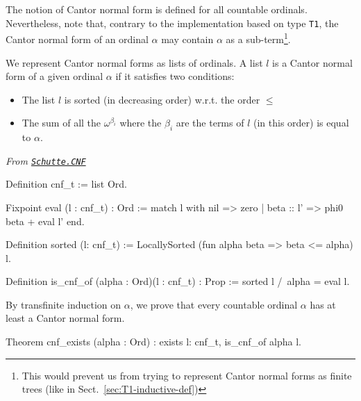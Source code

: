 {The notion of Cantor normal form is defined for all countable ordinals.
Nevertheless, note that, contrary to the implementation based on type \texttt{T1},
the Cantor normal form of an ordinal $\alpha$ may contain $\alpha$ as a 
sub-term\footnote{This would prevent us from trying to represent Cantor normal forms as finite trees (like in Sect.~\ref{sec:T1-inductive-def})}.


We represent  Cantor normal forms as lists of ordinals.
A  list $l$ is a Cantor normal form of a given ordinal $\alpha$ if it satisfies two conditions:



\begin{itemize}
\item The list  $l$ is sorted (in decreasing order) w.r.t. the order $\leq$
\item The sum of all the  $\omega^{\beta_i}$ where the $\beta_i$ are the terms of $l$ (in this order) is equal to $\alpha$.
\end{itemize}



\vspace{4pt}

\noindent\emph{From \href{../theories/html/hydras.Schutte.CNF.html\#cnf_t}%
{\texttt{Schutte.CNF}}}


\begin{Coqsrc}
 Definition cnf_t := list Ord.

Fixpoint eval (l : cnf_t) : Ord :=
  match l with nil => zero
              | beta :: l' => phi0 beta + eval l'
  end.

Definition sorted (l: cnf_t) :=
  LocallySorted (fun alpha beta => beta <= alpha) l.

Definition is_cnf_of (alpha : Ord)(l : cnf_t) : Prop :=
  sorted l /\ alpha = eval l.
\end{Coqsrc}


By transfinite induction on $\alpha$, we prove that every countable ordinal $\alpha$ 
 has at least a Cantor normal form.

\begin{Coqsrc}
Theorem cnf_exists (alpha : Ord) :
  exists l: cnf_t, is_cnf_of alpha l.
\end{Coqsrc}

}
